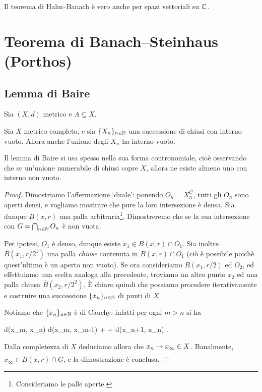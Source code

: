 \begin{remark}
	Il teorema di Hahn--Banach è vero anche per spazi vettoriali su $\mathbb{C}$.%
\end{remark}

\section{Teorema di Banach--Steinhaus (Porthos)}
\subsection{Lemma di Baire}
Sia $(X,d)$ metrico e $A \subseteq X$.

\begin{lemma}[Baire]
\label{lemma:baire}
	Sia $X$ metrico completo, e sia $\{X_n\}_{n \in \mathbb{N}}$ una successione di chiusi con interno vuoto.
	Allora anche l'unione degli $X_n$ ha interno vuoto.
\end{lemma}
\begin{remark}
	Il lemma di Baire si usa spesso nella sua forma contronomiale, cioè osservando che se un'unione numerabile di chiusi copre $X$, allora ne esiste almeno uno con interno non vuoto.
\end{remark}
\begin{proof}
	Dimostriamo l'affermazione `duale': ponendo $O_n = X_n^C$, tutti gli $O_n$ sono aperti densi, e vogliamo mostrare che pure la loro intersezione è densa.
	Sia dunque $B(x,r)$ una palla arbitraria\footnote{Consideriamo le palle aperte.}. Dimostreremo che se la sua intersezione con $G = \bigcap_{n \in \mathbb{N}} O_n$ è non vuota.

	Per ipotesi, $O_1$ è denso, dunque esiste $x_1 \in B(x,r) \cap O_1$. Sia inoltre $\bar B(x_1, r/2^1)$ una palla \emph{chiuse} contenuta in $B(x, r) \cap O_1$ (ciò è possibile poichè quest'ultimo è un aperto non vuoto).
	Se ora consideriamo $B(x_1, r/2)$ ed $O_2$, ed effettuiamo una scelta analoga alla precedente, troviamo un altro punto $x_2$ ed una palla chiusa $\bar B(x_2, r/2^2)$. È chiaro quindi che possiamo procedere iterativamente e costruire una successione $\{x_n\}_{n \in \mathbb{N}}$ di punti di $X$.

	Notiamo che $\{x_n\}_{n \in \mathbb{N}}$ è di Cauchy: infatti per ogni $m > n$ si ha
	\begin{eqalign*}
		d(x_m, x_n) \leq d(x_m, x_{m-1}) + \cdots + d(x_{n+1}, x_n) \leq {}.
	\end{eqalign*}
	Dalla completezza di $X$ deduciamo allora che $x_n \underset{{}}{\rightarrow} x_\infty \in X$. Banalmente, $x_\infty \in B(x,r) \cap G$, e la dimostrazione è conclusa.
\end{proof}

